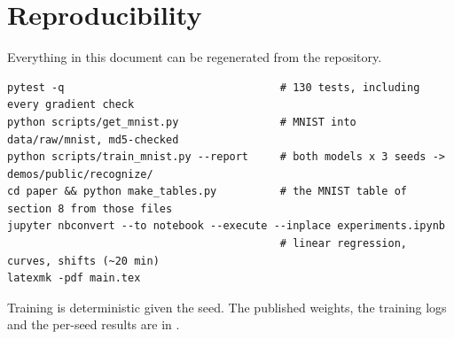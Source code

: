 \section{Reproducibility}
\label{sec:reproducibility}

Everything in this document can be regenerated from the repository.
\begin{lstlisting}
pytest -q                                  # 130 tests, including every gradient check
python scripts/get_mnist.py                # MNIST into data/raw/mnist, md5-checked
python scripts/train_mnist.py --report     # both models x 3 seeds -> demos/public/recognize/
cd paper && python make_tables.py          # the MNIST table of section 8 from those files
jupyter nbconvert --to notebook --execute --inplace experiments.ipynb
                                           # linear regression, curves, shifts (~20 min)
latexmk -pdf main.tex
\end{lstlisting}
Training is deterministic given the seed. The published weights, the training logs and the
per-seed results are in .
